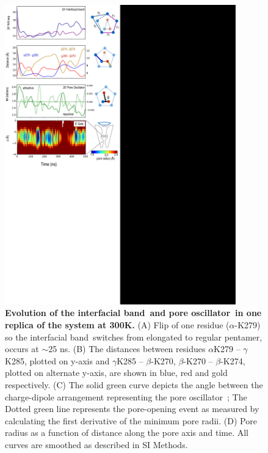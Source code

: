 \documentclass[9pt,onecolumn,oneside,lineno]{pnas-new}
\newcommand{\fivering}{interfacial band~}
\newcommand{\triad}{pore oscillator~}
\begin{document}
\begin{figure}
\begin{center}
\includegraphics[width = 100mm]{figures_2/pore_opening_events_K300_1.pdf}
\end{center}
\caption{{\bf Evolution of the \fivering and \triad in one replica of the \WT system at 300K.} (A) Flip of one residue ($\alpha$-K279) so the \fivering switches from elongated to regular pentamer, occurs at $\sim$25 ns. (B) The distances between residues $\alpha$K279 -- $\gamma$K285, plotted on y-axis and  $\gamma$K285 -- $\beta$-K270, $\beta$-K270 -- $\beta$-K274, plotted on alternate y-axis, are shown in blue, red and gold respectively. (C) The solid green curve depicts the angle between the charge-dipole arrangement representing the \triad; The Dotted green line represents the pore-opening event as measured by calculating the  first derivative of the minimum pore radii. (D) Pore radius as a function of distance along the pore axis and time.  All curves are smoothed as described in SI Methods.}
\label{fig:K300_1}
\end{figure}
\end{document}
